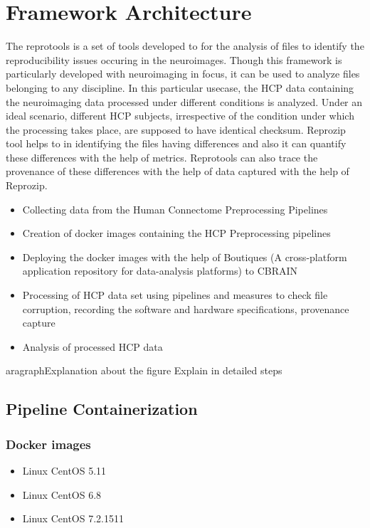\chapter{Framework Architecture}
The reprotools  is a set of tools developed to for the analysis of files to identify the reproducibility issues occuring in the neuroimages. Though this framework is particularly developed with neuroimaging in focus, it can be used to analyze files belonging to any discipline. In this particular usecase, the HCP data containing the neuroimaging data processed under different conditions is analyzed. Under an ideal scenario, different HCP subjects, irrespective of the condition under which the processing takes place, are supposed to have identical checksum. Reprozip tool helps to in identifying the files having differences and also it can quantify these differences with the help of metrics. Reprotools can also trace the provenance of these differences with the help of data captured with the help of Reprozip.

  \begin{itemize}
  \item Collecting data from the Human Connectome Preprocessing Pipelines \cite{DBHumanConnectome}
  \item Creation of docker images containing the HCP Preprocessing pipelines
  \item Deploying the docker images with the help of Boutiques (A cross-platform application repository for data-analysis platforms) to CBRAIN
  \item Processing of HCP data set using pipelines and measures to check file corruption, recording the software and hardware specifications, provenance capture
  \item Analysis of processed HCP data
  \end{itemize} 
 
\p    aragraph{Explanation about the figure}
Explain in detailed steps

\section{Pipeline Containerization}
\subsection{Docker images}
\begin{itemize}
  \item Linux CentOS 5.11
  \item Linux CentOS 6.8 
  \item Linux CentOS 7.2.1511
\end{itemize}

